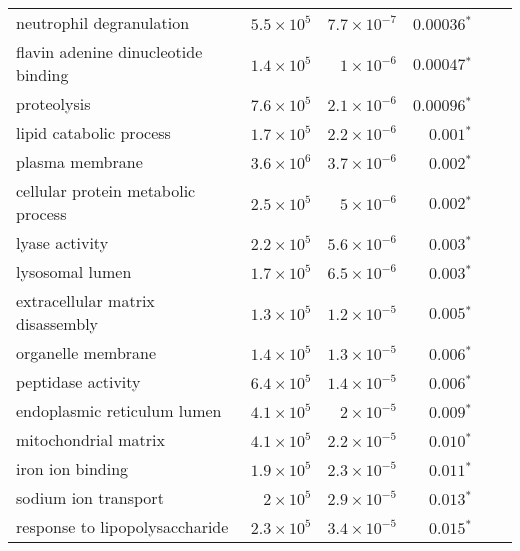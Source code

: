 \begin{longtable}{|l|r|r|r|r|r|}
    neutrophil degranulation                 & $5.5\times 10^{5}$ & $7.7\times 10^{-7}$  & $\bm{0.00036{^*}}$              \\
    flavin adenine dinucleotide binding      & $1.4\times 10^{5}$ & $ 1\times 10^{-6}$   & $\bm{0.00047{^*}}$              \\
    proteolysis                              & $7.6\times 10^{5}$ & $2.1\times 10^{-6}$  & $\bm{0.00096{^*}}$              \\
    lipid catabolic process                  & $1.7\times 10^{5}$ & $2.2\times 10^{-6}$  & $\bm{ 0.001{^*}}$               \\
    plasma membrane                          & $3.6\times 10^{6}$ & $3.7\times 10^{-6}$  & $\bm{ 0.002{^*}}$               \\
    cellular protein metabolic process       & $2.5\times 10^{5}$ & $ 5\times 10^{-6}$   & $\bm{ 0.002{^*}}$               \\
    lyase activity                           & $2.2\times 10^{5}$ & $5.6\times 10^{-6}$  & $\bm{ 0.003{^*}}$               \\
    lysosomal lumen                          & $1.7\times 10^{5}$ & $6.5\times 10^{-6}$  & $\bm{ 0.003{^*}}$               \\
    extracellular matrix disassembly         & $1.3\times 10^{5}$ & $1.2\times 10^{-5}$  & $\bm{ 0.005{^*}}$               \\
    organelle membrane                       & $1.4\times 10^{5}$ & $1.3\times 10^{-5}$  & $\bm{ 0.006{^*}}$               \\
    peptidase activity                       & $6.4\times 10^{5}$ & $1.4\times 10^{-5}$  & $\bm{ 0.006{^*}}$               \\
    endoplasmic reticulum lumen              & $4.1\times 10^{5}$ & $ 2\times 10^{-5}$   & $\bm{ 0.009{^*}}$               \\
    mitochondrial matrix                     & $4.1\times 10^{5}$ & $2.2\times 10^{-5}$  & $\bm{ 0.010{^*}}$               \\
    iron ion binding                         & $1.9\times 10^{5}$ & $2.3\times 10^{-5}$  & $\bm{ 0.011{^*}}$               \\
    sodium ion transport                     & $ 2\times 10^{5}$  & $2.9\times 10^{-5}$  & $\bm{ 0.013{^*}}$               \\
    response to lipopolysaccharide           & $2.3\times 10^{5}$ & $3.4\times 10^{-5}$  & $\bm{ 0.015{^*}}$               \\

\end{longtable}
